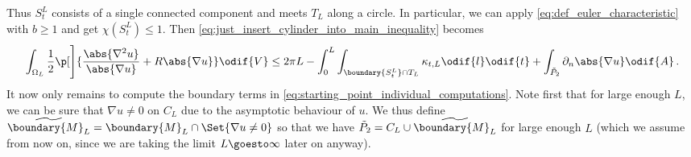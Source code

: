 \documentclass[titlepage,numbers=noenddot,oneside,%
cleardoublepage=empty,paper=a4,fontsize=11pt,%
english,%
]{scrartcl}
\newcommand*{\mathfullstop}{\,.}
\begin{document}
Thus \( S_t^L \) consists of a single connected component and meets \( T_L \) along a circle. In particular, we can apply \cref{eq:def_euler_characteristic} with \( b\geq 1 \) and get \( \chi(S_t^L)\leq 1 \). Then \cref{eq:just_insert_cylinder_into_main_inequality} becomes
\begin{equation}
    \int_{\Omega_L} \frac{1}{2}\p[\Bigg]{\frac{\abs{\nabla^2 u}}{\abs{\nabla u}}+R\abs{\nabla u} }\odif{V} \leq2\pi L- \int_{0}^{L}\int _{\boundary{S_t^L} \cap T_L}\kappa_{t,L}\odif{l}\odif{t}+ \int_{\tilde{P}_2}\partial_{n} \abs{\nabla u}\odif{A}\mathfullstop\label{eq:starting_point_individual_computations}
\end{equation}
It now only remains to compute the boundary terms in \cref{eq:starting_point_individual_computations}. Note first that for large enough \( L \), we can be sure that \( \nabla u\neq 0 \) on \( C_L \) due to the asymptotic behaviour of \( u \). We thus define \( \widetilde{\boundary{M}_L}=\boundary{M}_L\cap \Set{\nabla u\neq 0} \) so that we have \( \tilde{P}_2=C_L\cup \widetilde{\boundary{M}_L} \) for large enough \( L \) (which we assume from now on, since we are taking the limit \( L\goesto \infty \) later on anyway).
\end{document}
